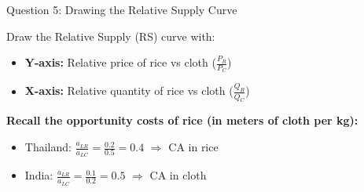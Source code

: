 \documentclass{beamer}
\begin{document}

\begin{frame}{Question 5: Drawing the Relative Supply Curve}

Draw the Relative Supply (RS) curve with:
\begin{itemize}
    \item \textbf{Y-axis:} Relative price of rice vs cloth ($\frac{P_R}{P_C}$)
    \item \textbf{X-axis:} Relative quantity of rice vs cloth ($\frac{Q_R}{Q_C}$)
\end{itemize}

\vspace{0.5cm}

\textbf{Recall the opportunity costs of rice (in meters of cloth per kg):}
\begin{itemize}
    \item Thailand: $\frac{a_{LR}}{a_{LC}} = \frac{0.2}{0.5} = 0.4$ $\Rightarrow$ CA in rice
    \item India: $\frac{a_{LR}}{a_{LC}} = \frac{0.1}{0.2} = 0.5$ $\Rightarrow$ CA in cloth
\end{itemize}

\end{frame}

\end{document}

